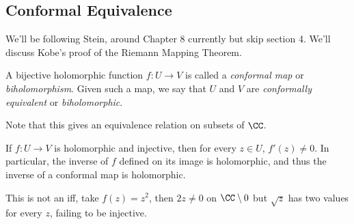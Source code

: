\hypertarget{conformal-equivalence}{%
\subsection{Conformal Equivalence}\label{conformal-equivalence}}

We'll be following Stein, around Chapter 8 currently but skip section 4.
We'll discuss Kobe's proof of the Riemann Mapping Theorem.

\begin{description}
\tightlist
\item[Definition]
A bijective holomorphic function \(f: U \to V\) is called a
\emph{conformal map} or \emph{biholomorphism}. Given such a map, we say
that \(U\) and \(V\) are \emph{conformally equivalent} or
\emph{biholomorphic}.
\end{description}

Note that this gives an equivalence relation on subsets of \(\CC\).

\begin{description}
\tightlist
\item[Proposition (1.1)]
If \(f: U \to V\) is holomorphic and injective, then for every
\(z\in U\), \(f'(z) \neq 0\). In particular, the inverse of \(f\)
defined on its image is holomorphic, and thus the inverse of a conformal
map is holomorphic.
\end{description}

This is not an iff, take \(f(z) = z^2\), then \(2z\neq 0\) on
\(\CC\setminus 0\) but \(\sqrt{z}\) has two values for every \(z\),
failing to be injective.

